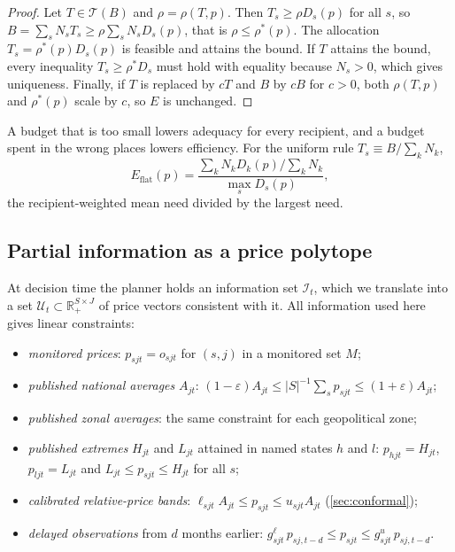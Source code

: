 \documentclass[preprint,12pt,number]{elsarticle}%
\theoremstyle{definition}
\theoremstyle{remark}
\newcommand{\R}{\mathbb{R}}
\newcommand{\U}{\mathcal{U}}
\newcommand{\I}{\mathcal{I}}
\begin{document}
\begin{proof}
Let $T\in\mathcal T(B)$ and $\rho=\rho(T,p)$. Then $T_s\ge\rho D_s(p)$ for all $s$, so $B=\sum_sN_sT_s\ge\rho\sum_sN_sD_s(p)$, that is $\rho\le\rho^*(p)$. The allocation $T_s=\rho^*(p)D_s(p)$ is feasible and attains the bound. If $T$ attains the bound, every inequality $T_s\ge\rho^*D_s$ must hold with equality because $N_s>0$, which gives uniqueness. Finally, if $T$ is replaced by $cT$ and $B$ by $cB$ for $c>0$, both $\rho(T,p)$ and $\rho^*(p)$ scale by $c$, so $E$ is unchanged.
\end{proof}

A budget that is too small lowers adequacy for every recipient, and a budget spent in the wrong places lowers efficiency. For the uniform rule $T_s\equiv B/\sum_kN_k$,
\begin{equation}\label{eq:flat}
E_{\mathrm{flat}}(p)=\frac{\sum_kN_kD_k(p)\big/\sum_kN_k}{\max_sD_s(p)},
\end{equation}
the recipient-weighted mean need divided by the largest need.

\subsection{Partial information as a price polytope}

At decision time the planner holds an information set $\I_t$, which we translate into a set $\U_t\subset\R^{S\times J}_{+}$ of price vectors consistent with it. All information used here gives linear constraints:
\begin{itemize}
\item[(U1)] \emph{monitored prices}: $p_{sjt}=o_{sjt}$ for $(s,j)$ in a monitored set $M$;
\item[(U2)] \emph{published national averages} $A_{jt}$: $(1-\varepsilon)A_{jt}\le|S|^{-1}\sum_sp_{sjt}\le(1+\varepsilon)A_{jt}$;
\item[(U3)] \emph{published zonal averages}: the same constraint for each geopolitical zone;
\item[(U4)] \emph{published extremes} $H_{jt}$ and $L_{jt}$ attained in named states $h$ and $l$: $p_{hjt}=H_{jt}$, $p_{ljt}=L_{jt}$ and $L_{jt}\le p_{sjt}\le H_{jt}$ for all $s$;
\item[(U5)] \emph{calibrated relative-price bands}: $\ell_{sjt}A_{jt}\le p_{sjt}\le u_{sjt}A_{jt}$ (\cref{sec:conformal});
\item[(U6)] \emph{delayed observations} from $d$ months earlier: $g^{\ell}_{sjt}\,p_{sj,t-d}\le p_{sjt}\le g^{u}_{sjt}\,p_{sj,t-d}$.
\end{itemize}
\end{document}
